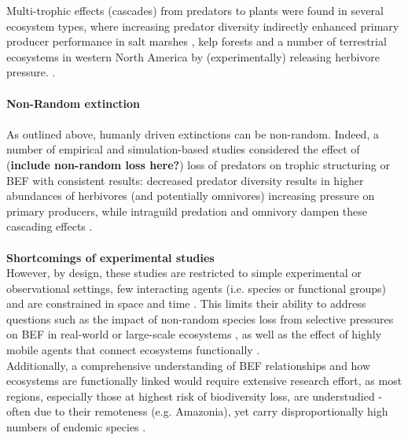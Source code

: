 Multi-trophic effects (cascades) from predators to plants were found in several ecosystem types, where increasing predator diversity indirectly enhanced primary producer performance in salt marshes \citep{Finke2004}, kelp forests \citep{Byrnes2006} and a number  of terrestrial ecosystems in western North America \citep{Beschta2009} by (experimentally) releasing herbivore pressure. .\\\\
%
\textbf{Non-Random extinction}\\
\\
As outlined above, humanly driven extinctions can be non-random.
Indeed, a number of empirical \citep{Sih1998,OConnor2008} and simulation-based\citep{Borrvall2000,Ives2005} studies considered the effect of (\textbf{include non-random loss here?}) loss of predators on trophic structuring or BEF with consistent results: 
decreased predator diversity results in higher abundances of herbivores (and potentially omnivores) increasing pressure on primary producers, while intraguild predation and omnivory dampen these cascading effects \citep{Duffy2007}.  \\\\
%
\textbf{Shortcomings of experimental studies}\\
However, by design, these studies are restricted to simple experimental or observational settings, few interacting agents (i.e. species or functional groups) and are constrained in space and time \citep{Dobson2006,Estes2011,Cardinale2012}. 
This limits their ability to address questions such as the impact of non-random species loss from selective pressures on BEF in real-world or large-scale ecosystems \citep{Saguin2014,Wardle2011}, as well as the effect of highly mobile agents that connect ecosystems functionally \citep{France2006}. \\
Additionally, a comprehensive understanding of BEF relationships and how ecosystems are functionally linked would require extensive research effort, as most regions, especially those at highest risk of biodiversity loss, are understudied - often due to their remoteness (e.g. Amazonia), yet carry disproportionally high numbers of endemic species \citep{Urban2015,Wake2008}.
